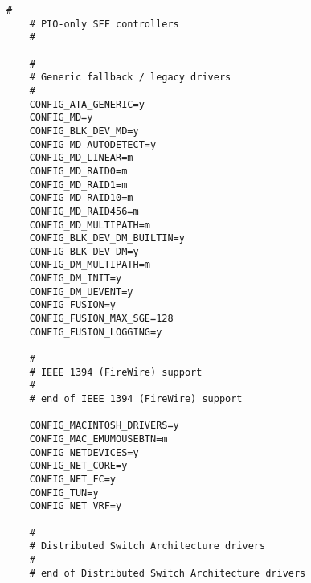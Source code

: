 \begin{multicols}{2}
\begin{lstlisting}[caption=kernel config,label=kconfig,]
    #
    # PIO-only SFF controllers
    #
    
    #
    # Generic fallback / legacy drivers
    #
    CONFIG_ATA_GENERIC=y
    CONFIG_MD=y
    CONFIG_BLK_DEV_MD=y
    CONFIG_MD_AUTODETECT=y
    CONFIG_MD_LINEAR=m
    CONFIG_MD_RAID0=m
    CONFIG_MD_RAID1=m
    CONFIG_MD_RAID10=m
    CONFIG_MD_RAID456=m
    CONFIG_MD_MULTIPATH=m
    CONFIG_BLK_DEV_DM_BUILTIN=y
    CONFIG_BLK_DEV_DM=y
    CONFIG_DM_MULTIPATH=m
    CONFIG_DM_INIT=y
    CONFIG_DM_UEVENT=y
    CONFIG_FUSION=y
    CONFIG_FUSION_MAX_SGE=128
    CONFIG_FUSION_LOGGING=y
    
    #
    # IEEE 1394 (FireWire) support
    #
    # end of IEEE 1394 (FireWire) support
    
    CONFIG_MACINTOSH_DRIVERS=y
    CONFIG_MAC_EMUMOUSEBTN=m
    CONFIG_NETDEVICES=y
    CONFIG_NET_CORE=y
    CONFIG_NET_FC=y
    CONFIG_TUN=y
    CONFIG_NET_VRF=y
    
    #
    # Distributed Switch Architecture drivers
    #
    # end of Distributed Switch Architecture drivers
    

\end{lstlisting}
\end{multicols}
